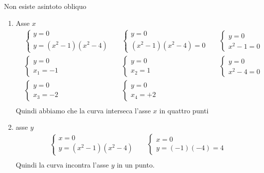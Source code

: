 \begin{exercise}
\begin{itemize}
\begin{enumerate}
				Non esiste asintoto obliquo
			\end{enumerate}
\begin{enumerate}
	\item Asse $x$
	\begin{align*}
	&\begin{cases}
	y=0\\
	y=(x^2-1)(x^2-4)
	\end{cases}&
	&\begin{cases}
	y=0\\
	(x^2-1)(x^2-4)=0
	\end{cases}
	&
	&\begin{cases}
	y=0\\
	x^2-1=0
	\end{cases}\\
	&\begin{cases}
	y=0\\
	x_1=-1
	\end{cases}&
	&\begin{cases}
	y=0\\
	x_2=1
	\end{cases}&&\begin{cases}
	y=0\\
	x^2-4=0
	\end{cases}\\
	&\begin{cases}
	y=0\\
	x_3=-2
	\end{cases}
		&&\begin{cases}
	y=0\\
	x_4=+2
	\end{cases}\\
	\end{align*}
	Quindi abbiamo che la curva interseca l'asse $x$ in quattro punti
	\item asse $y$
	\begin{align*}
	&\begin{cases}
	x=0\\
	y=(x^2-1)(x^2-4)
	\end{cases}&
	&\begin{cases}
	x=0\\
	y=(-1)(-4)=4
	\end{cases}\\
	\end{align*}
	Quindi la curva incontra l'asse $y$ in un punto.	
\end{enumerate}
\begin{align*}

\end{align*}
\end{itemize}
\end{exercise}
